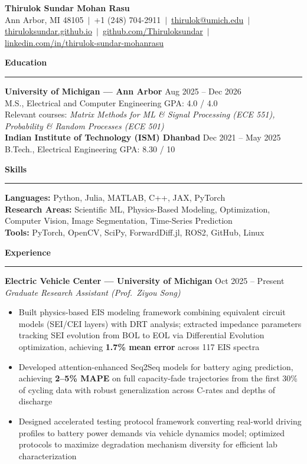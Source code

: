 \documentclass[9pt]{article}
\newcommand{\sect}[1]{\vspace{4pt}\noindent\textbf{\large #1}\vspace{3pt}\hrule\vspace{6pt}}
\begin{document}
\begin{center}
  {\Large \textbf{Thirulok Sundar Mohan Rasu}}\\[3pt]
  Ann Arbor, MI 48105 $\,|\,$ +1 (248) 704-2911 $\,|\,$
  \href{mailto:thirulok@umich.edu}{thirulok@umich.edu} $\,|\,$
  \href{https://thiruloksundar.github.io}{thiruloksundar.github.io} $\,|\,$
  \href{https://github.com/Thiruloksundar}{github.com/Thiruloksundar} $\,|\,$
  \href{https://www.linkedin.com/in/thirulok-sundar-mohanrasu/}{linkedin.com/in/thirulok-sundar-mohanrasu}
\end{center}
\vspace{-3mm}

\sect{Education}
\textbf{University of Michigan --- Ann Arbor} \hfill Aug 2025 -- Dec 2026\\
M.S., Electrical and Computer Engineering \hfill GPA: 4.0 / 4.0\\
Relevant courses: \emph{Matrix Methods for ML \& Signal Processing (ECE 551), Probability \& Random Processes (ECE 501)}\\[5pt]
\textbf{Indian Institute of Technology (ISM) Dhanbad} \hfill Dec 2021 -- May 2025\\
B.Tech., Electrical Engineering \hfill GPA: 8.30 / 10

\sect{Skills}
\textbf{Languages:} Python, Julia, MATLAB, C++, JAX, PyTorch\\
\textbf{Research Areas:} Scientific ML, Physics-Based Modeling, Optimization, Computer Vision, Image Segmentation, Time-Series Prediction\\
\textbf{Tools:} PyTorch, OpenCV, SciPy, ForwardDiff.jl, ROS2, GitHub, Linux

\sect{Experience}

\textbf{Electric Vehicle Center --- University of Michigan} \hfill Oct 2025 -- Present\\
\emph{Graduate Research Assistant (Prof.\ Ziyou Song)}
\vspace{-6mm}
\begin{itemize}[leftmargin=*,noitemsep,topsep=1pt]
  \item Built physics-based EIS modeling framework combining equivalent circuit models (SEI/CEI layers) with DRT analysis; extracted impedance parameters tracking SEI evolution from BOL to EOL via Differential Evolution optimization, achieving \textbf{1.7\% mean error} across 117 EIS spectra
  \item Developed attention-enhanced Seq2Seq models for battery aging prediction, achieving \textbf{2--5\% MAPE} on full capacity-fade trajectories from the first 30\% of cycling data with robust generalization across C-rates and depths of discharge
  \item Designed accelerated testing protocol framework converting real-world driving profiles to battery power demands via vehicle dynamics model; optimized protocols to maximize degradation mechanism diversity for efficient lab characterization
\end{itemize}
\end{document}
